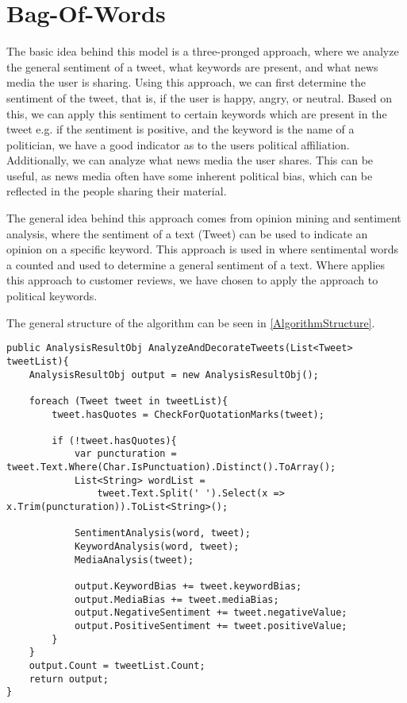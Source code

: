 \section{Bag-Of-Words}\label{sec:BoW}
The basic idea behind this model is a three-pronged approach, where we
analyze the general sentiment of a tweet, what keywords are present, and what
news media the user is sharing. Using this approach, we can first determine the
sentiment of the tweet, that is, if the user is happy, angry, or neutral. Based
on this, we can apply this sentiment to certain keywords which are present in
the tweet e.g. if the sentiment is positive, and the keyword is the name of a
politician, we have a good indicator as to the users political affiliation.
Additionally, we can analyze what news media the user shares. This can be
useful, as news media often have some inherent political bias, which can be
reflected in the people sharing their material.\nl 

The general idea behind this approach comes from opinion mining and sentiment
analysis, where the sentiment of a text (Tweet) can be used to indicate an
opinion on a specific keyword. This approach is used in
\citep{sarlan2014twitter} where sentimental words a counted and used to
determine a general sentiment of a text. Where \citep{sarlan2014twitter} applies
this approach to customer reviews, we have chosen to apply the approach to
political keywords.


The general structure of the algorithm can be seen in
\autoref{AlgorithmStructure}.\\

\begin{minipage}[H]{\linewidth}
\begin{lstlisting}[caption = Main method for handling the algorithm, label = AlgorithmStructure]
public AnalysisResultObj AnalyzeAndDecorateTweets(List<Tweet> tweetList){
	AnalysisResultObj output = new AnalysisResultObj();
   	
   	foreach (Tweet tweet in tweetList){
       	tweet.hasQuotes = CheckForQuotationMarks(tweet);
        
        if (!tweet.hasQuotes){
           	var puncturation = tweet.Text.Where(Char.IsPunctuation).Distinct().ToArray(); 
           	List<String> wordList = 
           		tweet.Text.Split(' ').Select(x => x.Trim(puncturation)).ToList<String>();
                       
            SentimentAnalysis(word, tweet);
            KeywordAnalysis(word, tweet);
            MediaAnalysis(tweet);

            output.KeywordBias += tweet.keywordBias;
            output.MediaBias += tweet.mediaBias;
            output.NegativeSentiment += tweet.negativeValue;
            output.PositiveSentiment += tweet.positiveValue;
        }
    }
    output.Count = tweetList.Count;
    return output;
}
\end{lstlisting}
\end{minipage}

